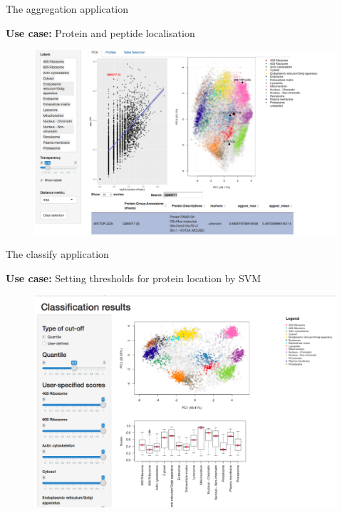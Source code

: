 \documentclass[bigger]{beamer}
\begin{document}

\begin{frame}{The aggregation application}
\smallskip
  \begin{small} \textbf{Use case:} Protein and peptide localisation
  \end{small}
  \begin{figure}
    \includegraphics[width=1\linewidth]{Figures/agg-app.png}
  \end{figure}
\end{frame}


\begin{frame}{The classify application}
\smallskip
  \begin{small} \textbf{Use case:} Setting thresholds for protein location by SVM
  \end{small}
  \begin{figure}
    \includegraphics[width=1\linewidth]{Figures/classify-app.png}
  \end{figure}
\end{frame}
\end{document}
